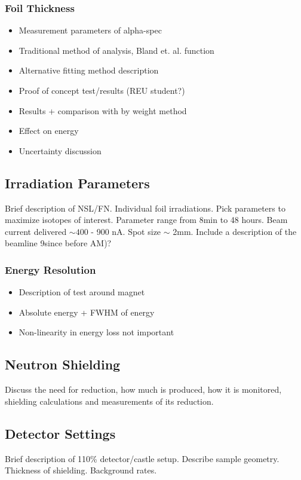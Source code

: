 \documentclass[final,3p,times,twocolumn,authoryear]{elsarticle_modified}
\begin{document}
	\subsubsection{Foil Thickness}
	\begin{itemize}
	\itemsep-0.2em 
	  \item Measurement parameters of alpha-spec
	  \item Traditional method of analysis, Bland et. al. function
	  \item Alternative fitting method description
	  \item Proof of concept test/results (REU student?)
	  \item Results + comparison with by weight method
	  \item Effect on energy
	  \item Uncertainty discussion
	\end{itemize}

\subsection{Irradiation Parameters}
\label{FN}
	Brief description of NSL/FN. Individual foil irradiations. Pick parameters to maximize isotopes of interest. Parameter range from 8min to 48 hours. Beam current delivered $\sim400$ - 900 nA. Spot size $\sim$ 2mm. Include a description of the beamline 9since before AM)? 
	\subsubsection{Energy Resolution}
	\begin{itemize}
	\itemsep-0.5em 
	  \item Description of test around magnet
	  \item Absolute energy + FWHM of energy
	  \item Non-linearity in energy loss not important
	\end{itemize}
	\subsection{Neutron Shielding}
	Discuss the need for reduction, how much is produced, how it is monitored, shielding calculations and measurements of its reduction.

\subsection{Detector Settings}
\label{Gamma}
Brief description of 110\% detector/castle setup. Describe sample geometry. Thickness of shielding. Background rates.
\end{document}
